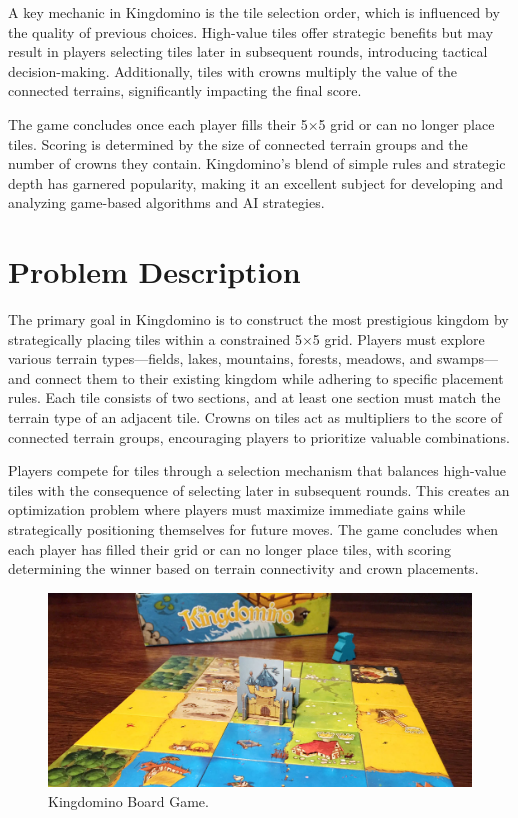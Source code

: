 \documentclass[conference]{IEEEtran}
\begin{document}
A key mechanic in Kingdomino is the tile selection order, which is influenced
by the quality of previous choices. High-value tiles offer strategic benefits
but may result in players selecting tiles later in subsequent rounds,
introducing tactical decision-making. Additionally, tiles with crowns multiply
the value of the connected terrains, significantly impacting the final score.

The game concludes once each player fills their 5$\times$5 grid or can no
longer place tiles. Scoring is determined by the size of connected terrain
groups and the number of crowns they contain. Kingdomino's blend of simple
rules and strategic depth has garnered popularity, making it an excellent
subject for developing and analyzing game-based algorithms and AI strategies.

\section{Problem Description}

The primary goal in Kingdomino is to construct the most prestigious kingdom by
strategically placing tiles within a constrained 5$\times$5 grid. Players must
explore various terrain types—fields, lakes, mountains, forests, meadows, and
swamps—and connect them to their existing kingdom while adhering to specific
placement rules. Each tile consists of two sections, and at least one section
must match the terrain type of an adjacent tile. Crowns on tiles act as
multipliers to the score of connected terrain groups, encouraging players to
prioritize valuable combinations.

Players compete for tiles through a selection mechanism that balances
high-value tiles with the consequence of selecting later in subsequent rounds.
This creates an optimization problem where players must maximize immediate
gains while strategically positioning themselves for future moves. The game
concludes when each player has filled their grid or can no longer place tiles,
with scoring determining the winner based on terrain connectivity and crown
placements.

\begin{figure}[htbp]
    \centerline{\includegraphics[width=\textwidth]{assets/kingdomino.jpg}}
    \caption{Kingdomino Board Game.}\label{fig:kingdomino}
\end{figure}
\end{document}
